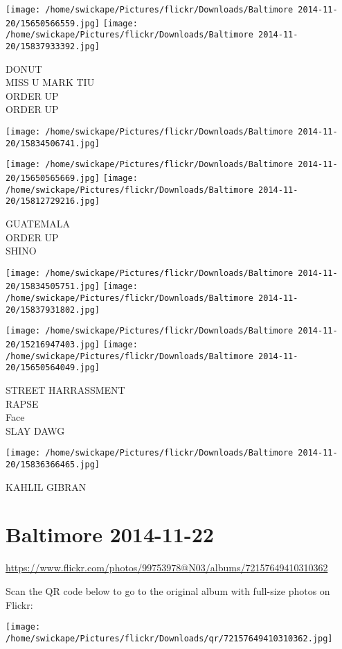 \documentclass[10pt,letterpaper]{article}
\begin{document}
\texttt{[image: /home/swickape/Pictures/flickr/Downloads/Baltimore 2014-11-20/15650566559.jpg]}
\texttt{[image: /home/swickape/Pictures/flickr/Downloads/Baltimore 2014-11-20/15837933392.jpg]}

DONUT\\
MISS U MARK TIU\\
ORDER UP\\
ORDER UP
\pagebreak

\texttt{[image: /home/swickape/Pictures/flickr/Downloads/Baltimore 2014-11-20/15834506741.jpg]}

\vspace{0.25in}
\texttt{[image: /home/swickape/Pictures/flickr/Downloads/Baltimore 2014-11-20/15650565669.jpg]}
\texttt{[image: /home/swickape/Pictures/flickr/Downloads/Baltimore 2014-11-20/15812729216.jpg]}

GUATEMALA\\
ORDER UP\\
SHINO
\pagebreak

\texttt{[image: /home/swickape/Pictures/flickr/Downloads/Baltimore 2014-11-20/15834505751.jpg]}
\texttt{[image: /home/swickape/Pictures/flickr/Downloads/Baltimore 2014-11-20/15837931802.jpg]}

\texttt{[image: /home/swickape/Pictures/flickr/Downloads/Baltimore 2014-11-20/15216947403.jpg]}
\texttt{[image: /home/swickape/Pictures/flickr/Downloads/Baltimore 2014-11-20/15650564049.jpg]}

STREET HARRASSMENT\\
RAPSE\\
Face\\
SLAY DAWG
\pagebreak

\texttt{[image: /home/swickape/Pictures/flickr/Downloads/Baltimore 2014-11-20/15836366465.jpg]}

KAHLIL GIBRAN
\pagebreak

\section*{Baltimore 2014-11-22}

\url{https://www.flickr.com/photos/99753978@N03/albums/72157649410310362}

Scan the QR code below to go to the original album with full-size photos on Flickr:

\texttt{[image: /home/swickape/Pictures/flickr/Downloads/qr/72157649410310362.jpg]}
\pagebreak
\end{document}
